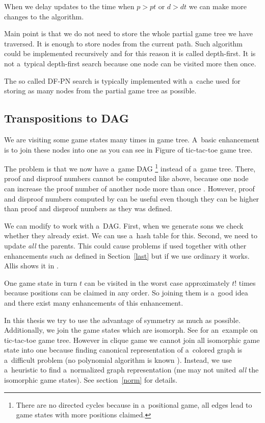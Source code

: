 When we delay updates to the time when $p > pt$ or $d > dt$ we can make
more changes to the algorithm. 

Main point is that we do not need to store the whole partial game tree we have traversed. It is
enough to store nodes from the current path. Such algorithm could be implemented
recursively and for this reason it is called depth-first.
It is not a~typical depth-first search because one node can be visited more
then once. 

The so called DF-PN search is typically implemented with a~cache used for storing as many
nodes from the partial game tree as possible. 

\subsection{Transpositions to DAG} \label{DAG}
 
We are visiting some
game states many times in game tree. A~basic enhancement is to join these nodes into one as 
you can see in Figure  of tic-tac-toe game tree.

The problem is that we now have a~game DAG \footnote{There are no directed cycles
because in a~positional game, all edges lead to game states with more positions
claimed.} instead of a~game tree. There, proof and disproof numbers cannot be
computed like above, because one node can increase the proof number of another
node more than once .
However, proof and disproof numbers computed by  can be useful even
though they can be higher than proof and disproof numbers as they was defined. 

We can modify  to work with a~DAG. First, when we generate sons we
check whether they already exist. We can use a~hash table for this. Second, we
need to update \emph{all} the parents. This could cause problems if used
together with other enhancements such as  defined in
Section~\ref{last} but if we use ordinary  it works. Allis shows it in
\cite{allis}.

One game state in turn $t$ can be visited in the worst case approximately $t!$ times because
positions can be claimed in any order. So joining them is a~good idea and
there exist many enhancements of this enhancement.

In this thesis we try to use the advantage of symmetry as much as possible.
Additionally, we join the game states which are isomorph. See 
for an~example  on tic-tac-toe game tree. However in clique game we cannot join
all isomorphic game state into one because finding canonical 
representation of a~colored graph is a~difficult problem (no polynomial algorithm
is known \cite{canonical}).
Instead, we use a~heuristic to find a~normalized graph representation 
(me may not united \emph{all} the isomorphic game states). 
See section~\ref{norm} for details.


